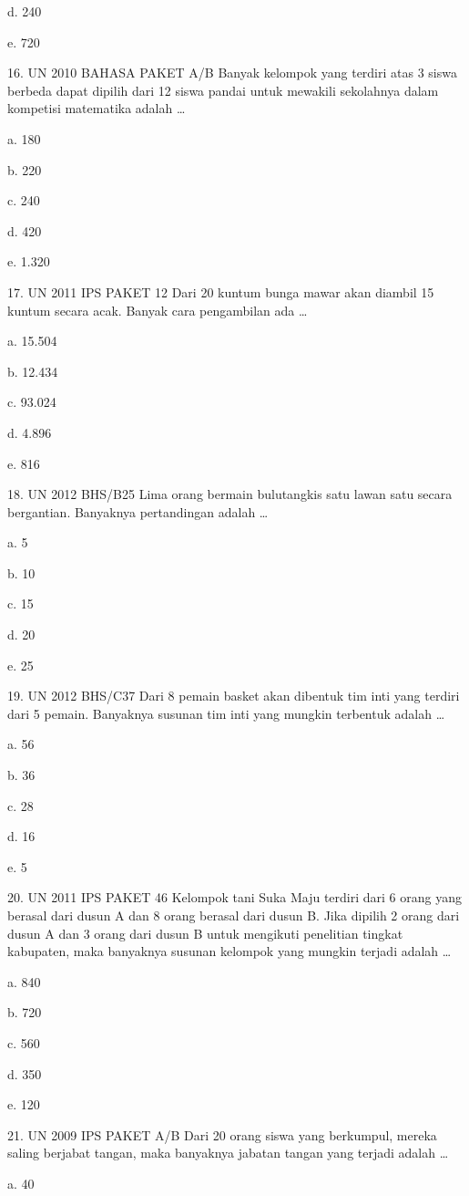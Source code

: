 \documentclass[11pt,fleqn]{book} %
\begin{document}
d.	240

e.	720

16.	UN 2010 BAHASA PAKET A/B 
Banyak kelompok yang terdiri atas 3 siswa berbeda dapat dipilih dari 12 siswa pandai untuk mewakili sekolahnya dalam kompetisi matematika adalah …

a.	180

b.	220

c.	240

d.	420

e.	1.320

17.	UN 2011 IPS PAKET 12 
Dari 20 kuntum bunga mawar akan diambil 15 kuntum secara acak. Banyak cara pengambilan ada …

a.	15.504

b.	12.434

c.	93.024

d.	4.896

e.	816

18.	UN 2012 BHS/B25 
Lima orang bermain bulutangkis satu lawan satu secara bergantian. Banyaknya pertandingan adalah …

a.	5

b.	10

c.	15

d.	20

e.	25

19.	UN 2012 BHS/C37 
Dari 8 pemain basket akan dibentuk tim inti yang terdiri dari 5 pemain. Banyaknya susunan tim inti yang mungkin terbentuk adalah …

a.	56

b.	36

c.	28

d.	16

e.	5

20.	UN 2011 IPS PAKET 46 
Kelompok tani Suka Maju terdiri dari 6 orang yang berasal dari dusun A dan 8 orang berasal dari dusun B. Jika dipilih 2 orang dari dusun A dan 3 orang dari dusun B untuk mengikuti penelitian tingkat kabupaten, maka banyaknya susunan kelompok yang mungkin terjadi adalah …

a.	840

b.	720

c.	560

d.	350

e.	120

21.	UN 2009 IPS PAKET A/B 
Dari 20 orang siswa yang berkumpul, mereka saling berjabat tangan, maka banyaknya jabatan tangan yang terjadi adalah …

a.	40
\end{document}
